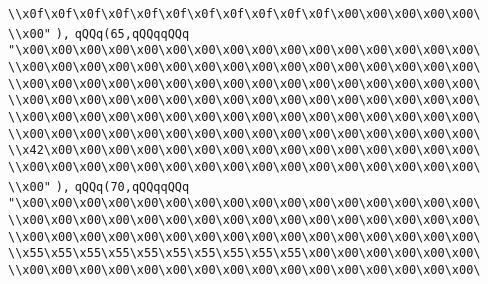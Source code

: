 \verb|\\x0f\x0f\x0f\x0f\x0f\x0f\x0f\x0f\x0f\x0f\x0f\x00\x00\x00\x00\x00\|\newline
\verb|\\x00"|\newline
\verb|),|\newline
\verb|qQQq(65,qQQqqQQq|\newline
\verb|"\x00\x00\x00\x00\x00\x00\x00\x00\x00\x00\x00\x00\x00\x00\x00\x00\|\newline
\verb|\\x00\x00\x00\x00\x00\x00\x00\x00\x00\x00\x00\x00\x00\x00\x00\x00\|\newline
\verb|\\x00\x00\x00\x00\x00\x00\x00\x00\x00\x00\x00\x00\x00\x00\x00\x00\|\newline
\verb|\\x00\x00\x00\x00\x00\x00\x00\x00\x00\x00\x00\x00\x00\x00\x00\x00\|\newline
\verb|\\x00\x00\x00\x00\x00\x00\x00\x00\x00\x00\x00\x00\x00\x00\x00\x00\|\newline
\verb|\\x00\x00\x00\x00\x00\x00\x00\x00\x00\x00\x00\x00\x00\x00\x00\x00\|\newline
\verb|\\x42\x00\x00\x00\x00\x00\x00\x00\x00\x00\x00\x00\x00\x00\x00\x00\|\newline
\verb|\\x00\x00\x00\x00\x00\x00\x00\x00\x00\x00\x00\x00\x00\x00\x00\x00\|\newline
\verb|\\x00"|\newline
\verb|),|\newline
\verb|qQQq(70,qQQqqQQq|\newline
\verb|"\x00\x00\x00\x00\x00\x00\x00\x00\x00\x00\x00\x00\x00\x00\x00\x00\|\newline
\verb|\\x00\x00\x00\x00\x00\x00\x00\x00\x00\x00\x00\x00\x00\x00\x00\x00\|\newline
\verb|\\x00\x00\x00\x00\x00\x00\x00\x00\x00\x00\x00\x00\x00\x00\x00\x00\|\newline
\verb|\\x55\x55\x55\x55\x55\x55\x55\x55\x55\x55\x00\x00\x00\x00\x00\x00\|\newline
\verb|\\x00\x00\x00\x00\x00\x00\x00\x00\x00\x00\x00\x00\x00\x00\x00\x00\|\newline
